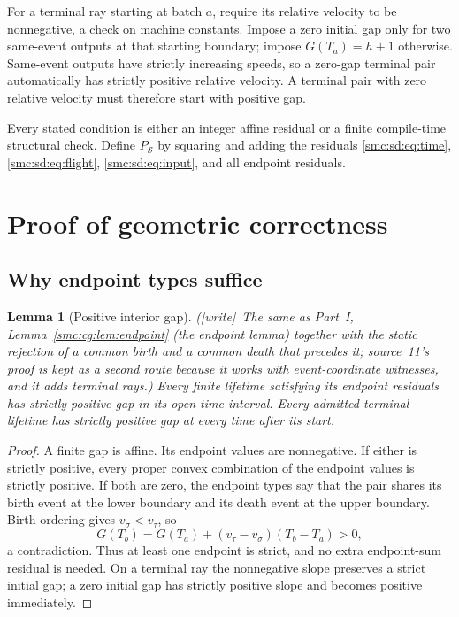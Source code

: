 \documentclass[11pt,letterpaper]{article}
\numberwithin{equation}{section}
\newtheorem{lemma}[theorem]{Lemma}
\theoremstyle{definition}
\theoremstyle{remark}
\newcommand{\cS}{\mathcal S}
\newcommand{\wtag}{\textup{[write]}}
\begin{document}
For a terminal ray starting at batch $a$, require its relative velocity to be nonnegative, a check on machine constants. Impose a zero initial gap only for two same-event outputs at that starting boundary; impose $G(T_a)=h+1$ otherwise. Same-event outputs have strictly increasing speeds, so a zero-gap terminal pair automatically has strictly positive relative velocity. A terminal pair with zero relative velocity must therefore start with positive gap.

Every stated condition is either an integer affine residual or a finite compile-time structural check. Define $P_\cS$ by squaring and adding the residuals \eqref{smc:sd:eq:time}, \eqref{smc:sd:eq:flight}, \eqref{smc:sd:eq:input}, and all endpoint residuals.

\section{Proof of geometric correctness}\label{smc:sd:sec:proof}
\subsection{Why endpoint types suffice}
\begin{lemma}[Positive interior gap]\label{smc:sd:lem:interior}
(\wtag\ The same as Part~I, Lemma~\ref{smc:cg:lem:endpoint} (the endpoint lemma) together with the static rejection of a common birth and a common death that precedes it; source~11's proof is kept as a second route because it works with event-coordinate witnesses, and it adds terminal rays.) Every finite lifetime satisfying its endpoint residuals has strictly positive gap in its open time interval. Every admitted terminal lifetime has strictly positive gap at every time after its start.
\end{lemma}
\begin{proof}
A finite gap is affine. Its endpoint values are nonnegative. If either is strictly positive, every proper convex combination of the endpoint values is strictly positive. If both are zero, the endpoint types say that the pair shares its birth event at the lower boundary and its death event at the upper boundary. Birth ordering gives $v_\sigma<v_\tau$, so
\[
 G(T_b)=G(T_a)+(v_\tau-v_\sigma)(T_b-T_a)>0,
\]
a contradiction. Thus at least one endpoint is strict, and no extra endpoint-sum residual is needed. On a terminal ray the nonnegative slope preserves a strict initial gap; a zero initial gap has strictly positive slope and becomes positive immediately.
\end{proof}
\end{document}
